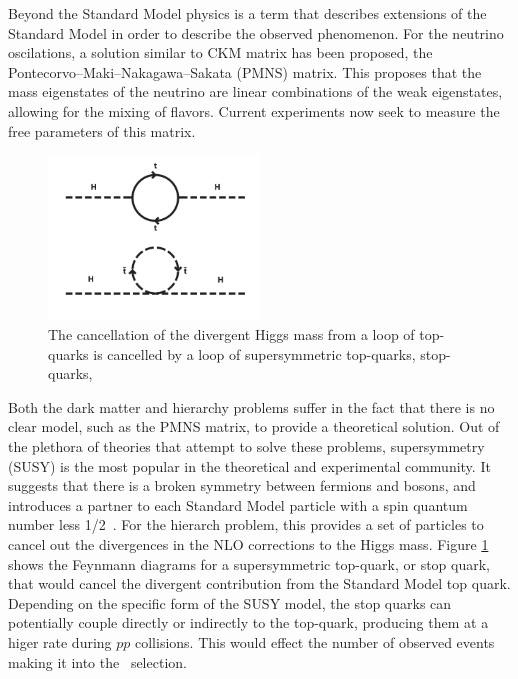 \par Beyond the Standard Model physics is a term that describes
extensions of the Standard Model in order to describe the observed
phenomenon.  For the neutrino oscilations, a solution similar to CKM
matrix has been proposed, the Pontecorvo–Maki–Nakagawa–Sakata (PMNS)
matrix.  This proposes that the mass eigenstates of the neutrino are
linear combinations of the weak eigenstates, allowing for the mixing
of flavors.  Current experiments now seek to measure the free
parameters of this matrix.  

\begin{figure}[h]
   \centering
  \includegraphics[width=0.5\textwidth]{Figures/Basic_Diagrams/hierarchy_problem_susy_solution.png}
  \caption{The cancellation of the divergent Higgs mass from a loop of
  top-quarks is cancelled by a loop of supersymmetric top-quarks,
  stop-quarks,} \label{fig:hierarchy_problem}
\end{figure}

\par Both the dark matter and hierarchy problems suffer in the fact
that there is no clear model, such as the PMNS matrix, to provide a
theoretical solution.  Out of the plethora of theories that attempt to
solve these problems, supersymmetry (SUSY) is the most popular in the
theoretical and experimental community.  It suggests that there is a
broken symmetry between fermions and bosons, and introduces a partner
to each Standard Model particle with a spin quantum number less
1/2~\cite{Martin_SUSY_primer}.  For the hierarch problem, this
provides a set of particles to cancel out the divergences in the NLO
corrections to the Higgs mass.  Figure \ref{fig:hierarchy_problem}
shows the Feynmann diagrams for a supersymmetric top-quark, or stop
quark, that would cancel the divergent contribution from the Standard
Model top quark.  Depending on the specific form of the SUSY model,
the stop quarks can potentially couple directly or indirectly to the
top-quark, producing them at a higer rate during $pp$ collisions.
This would effect the number of observed events making it into the
\ttH~selection.  

